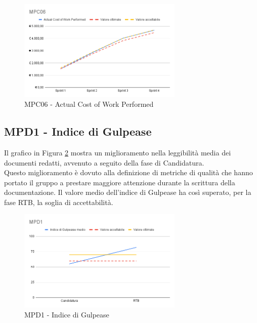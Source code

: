 \begin{figure}[htbp]
    \centering
    \includegraphics[width=0.7\textwidth]{img/MPC06.png}
    \caption{MPC06 - Actual Cost of Work Performed}
    \label{fig:mpc06}
\end{figure}

\newpage
\subsection{MPD1 - Indice di Gulpease}
\label{s:mpd1}
Il grafico in Figura \ref{fig:mpd1} mostra un miglioramento nella leggibilità media dei documenti redatti, avvenuto a seguito della fase di Candidatura.\\
Questo miglioramento è dovuto alla definizione di metriche di qualità che hanno portato il gruppo a prestare maggiore attenzione durante la scrittura della documentazione.
Il valore medio dell'indice di Gulpease ha così superato, per la fase RTB, la soglia di accettabilità.

\begin{figure}[htbp]
    \centering
    \includegraphics[width=0.7\textwidth]{img/MPD1.png}
    \caption{MPD1 - Indice di Gulpease}
    \label{fig:mpd1}
\end{figure}